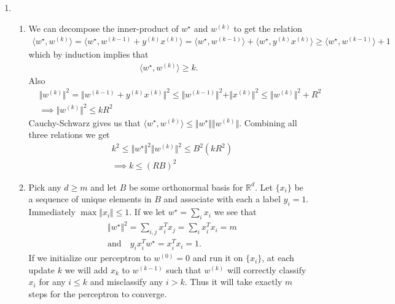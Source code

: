 \documentclass[11pt,letter]{article}
\begin{document}
\begin{enumerate}

\item \begin{enumerate}
    \item We can decompose the inner-product of $w^\star$ and $w^{(k)}$ to get the relation
    \begin{align*}
        \langle w^\star, w^{(k)} \rangle = \langle w^\star, w^{(k-1)} + y^{(k)}x^{(k)} \rangle = \langle w^\star, w^{(k-1)} \rangle + \langle w^\star, y^{(k)}x^{(k)} \rangle \ge \langle w^\star, w^{(k-1)} \rangle + 1
    \end{align*}
    which by induction implies that 
    \begin{align*}
        \langle w^\star, w^{(k)} \rangle \ge k.
    \end{align*}
    Also
    \begin{align*}
        & \Vert w^{(k)} \Vert^2 = \Vert w^{(k-1)} + y^{(k)}x^{(k)} \Vert^2 \le \Vert w^{(k-1)} \Vert^2 + \Vert x^{(k)} \Vert^2 \le \Vert w^{(k)} \Vert^2 + R^2 \\
        & \implies \Vert w^{(k)} \Vert^2 \le kR^2
    \end{align*}
    Cauchy-Schwarz gives us that $\langle w^\star, w^{(k)} \rangle \le \Vert w^\star \Vert \Vert w^{(k)} \Vert$.
    Combining all three relations we get
    \begin{align*}
        & k^2 \le \Vert w^\star \Vert^2 \Vert w^{(k)} \Vert^2 \le B^2(kR^2) \\
        & \implies k \le (RB)^2
    \end{align*}
    \item Pick any $d \ge m$ and let $B$ be some orthonormal basis for $\mathbb R^d$. 
    Let $\{x_i\}$ be a sequence of unique elements in $B$ and associate with each a label $y_i = 1$. 
    Immediately $\max \Vert x_i \Vert \le 1$. If we let $w^\star = \sum_i x_i$ we see that
    \begin{align*}
        &\Vert w^\star \Vert^2 = \sum_{i,j} x_i^Tx_j = \sum_i x_i^Tx_i = m \\
        & \text{and} \quad y_ix_i^Tw^\star = x_i^Tx_i = 1.
    \end{align*}
    If we initialize our perceptron to $w^{(0)}=0$ and run it on $\{x_i\}$, at each update $k$ we will add $x_k$ to $w^{(k-1)}$ such that $w^{(k)}$ will correctly classify $x_i$ for any $i \le k$ and misclassify any $i > k$. 
    Thus it will take exactly $m$ steps for the perceptron to converge.
    \end{enumerate}


\end{enumerate}
\end{document}

